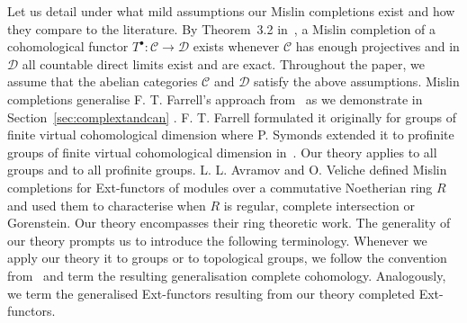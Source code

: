 \documentclass[12pt, a4paper]{article}
\numberwithin{equation}{section}
\theoremstyle{empty}
\theoremstyle{nonumberplain}
\begin{document}
Let us detail under what mild assumptions our Mislin completions exist and how they compare to the literature. By Theorem~3.2 in~\cite{ghe24}, a Mislin completion of a cohomological functor $T^{\bullet}: \mathcal{C} \rightarrow \mathcal{D}$ exists whenever $\mathcal{C}$ has enough projectives and in $\mathcal{D}$ all countable direct limits exist and are exact. Throughout the paper, we assume that the abelian categories $\mathcal{C}$ and $\mathcal{D}$ satisfy the above assumptions. Mislin completions generalise F.\! T.\! Farrell's approach from~\cite{far77} as we demonstrate in Section~\ref{sec:complextandcan} . F.\! T.\! Farrell formulated it originally for groups of finite virtual cohomological dimension where P.\! Symonds extended it to profinite groups of finite virtual cohomological dimension in~\cite[p.~34]{sym07}. Our theory applies to all groups and to all profinite groups. L.\! L.\! Avramov and O.\! Veliche defined Mislin completions for Ext-functors of modules over a commutative Noetherian ring $R$ and used them to characterise when $R$ is regular, complete intersection or Gorenstein. Our theory encompasses their ring theoretic work. The generality of our theory prompts us to introduce the following terminology. Whenever we apply our theory it to groups or to topological groups, we follow the convention from~\cite{kro95} and term the resulting generalisation complete cohomology. Analogously, we term the generalised Ext-functors resulting from our theory completed Ext-functors. \\
\end{document}
